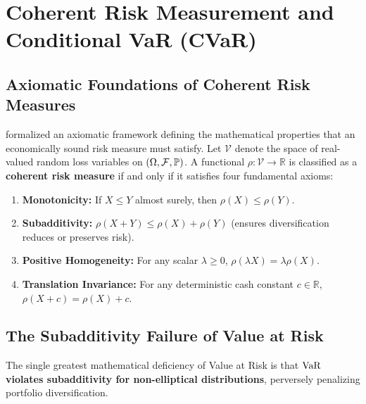 
\section{Coherent Risk Measurement and Conditional VaR (CVaR)}
\label{sec:coherent_risk_cvar}

\subsection{Axiomatic Foundations of Coherent Risk Measures}

\citet{artzner1999coherent} formalized an axiomatic framework defining the mathematical properties that an economically sound risk measure must satisfy. Let $\mathcal{V}$ denote the space of real-valued random loss variables on $(\Omega, \mathcal{F}, \mathbb{P})$. A functional $\rho: \mathcal{V} \to \mathbb{R}$ is classified as a \textbf{coherent risk measure} if and only if it satisfies four fundamental axioms:
\begin{enumerate}[leftmargin=1.5em, itemsep=1pt, parsep=0pt, label=\textbf{A\arabic*.}]
    \item \textbf{Monotonicity:} If $X \le Y$ almost surely, then $\rho(X) \le \rho(Y)$.
    \item \textbf{Subadditivity:} $\rho(X + Y) \le \rho(X) + \rho(Y)$ (ensures diversification reduces or preserves risk).
    \item \textbf{Positive Homogeneity:} For any scalar $\lambda \ge 0$, $\rho(\lambda X) = \lambda \rho(X)$.
    \item \textbf{Translation Invariance:} For any deterministic cash constant $c \in \mathbb{R}$, $\rho(X + c) = \rho(X) + c$.
\end{enumerate}

\subsection{The Subadditivity Failure of Value at Risk}

The single greatest mathematical deficiency of Value at Risk is that \textbf{$\operatorname{VaR}$ violates subadditivity for non-elliptical distributions}, perversely penalizing portfolio diversification.


